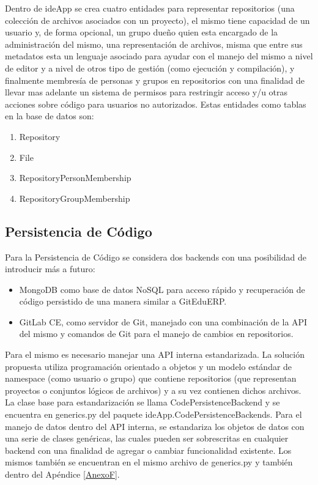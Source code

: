 Dentro de ideApp se crea cuatro entidades para representar repositorios (una colección de archivos asociados con un proyecto), el mismo tiene capacidad de un usuario y, de forma opcional, un grupo dueño quien esta encargado de la administración del mismo, una representación de archivos, misma que entre sus metadatos esta un lenguaje asociado para ayudar con el manejo del mismo a nivel de editor y a nivel de otros tipo de gestión (como ejecución y compilación), y finalmente membresía de personas y grupos en repositorios con una finalidad de llevar mas adelante un sistema de permisos para restringir acceso y/u otras acciones sobre código para usuarios no autorizados. Estas entidades como tablas en la base de datos son:
\begin{enumerate}
\item Repository
\item File
\item RepositoryPersonMembership
\item RepositoryGroupMembership
\end{enumerate}

\subsection{Persistencia de Código}
Para la Persistencia de Código se considera dos backends con una posibilidad de introducir más a futuro:
\begin{itemize}
	\item MongoDB como base de datos NoSQL para acceso rápido y recuperación de código persistido de una manera similar a GitEduERP.
    \item GitLab CE, como servidor de Git, manejado con una combinación de la API del mismo y comandos de Git para el manejo de cambios en repositorios.
\end{itemize}

Para el mismo es necesario manejar una API interna estandarizada. La solución propuesta utiliza programación orientado a objetos y un modelo estándar de namespace (como usuario o grupo) que contiene repositorios (que representan proyectos o conjuntos lógicos de archivos) y a su vez contienen dichos archivos. La clase base para estandarización se llama CodePersistenceBackend y se encuentra en generics.py del paquete ideApp.CodePersistenceBackends. Para el manejo de datos dentro del API interna, se estandariza los objetos de datos con una serie de clases genéricas, las cuales pueden ser sobrescritas en cualquier backend con una finalidad de agregar o cambiar funcionalidad existente. Los mismos también se encuentran en el mismo archivo de generics.py y también dentro del Apéndice \ref{AnexoF}.

